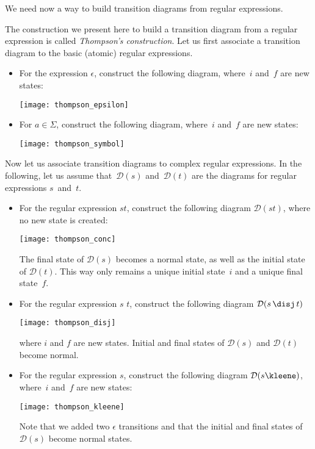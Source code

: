 We need now a way to build transition diagrams from regular
expressions.

The construction we present here to build a transition diagram from a
regular expression is called \emph{Thompson's construction}. Let us
first associate a transition diagram to the basic (atomic) regular
expressions.
\begin{itemize}

  \item For the expression \(\epsilon\), construct the following
    diagram, where~\(i\) and~\(f\) are new states:
  \begin{center}
    \texttt{[image: thompson\_epsilon]}
  \end{center}

  \item For \(a \in \Sigma\), construct the following diagram,
    where~\(i\) and~\(f\) are new states:
  \begin{center}
    \texttt{[image: thompson\_symbol]}
  \end{center}

\end{itemize}
Now let us associate transition diagrams to complex regular
expressions. In the following, let us assume that~\(\mathcal{D}(s)\)
and~\(\mathcal{D}(t)\) are the diagrams for regular expressions
\(s\)~and~\(t\).
\begin{itemize}

  \item For the regular expression \(st\), construct the following
    diagram \(\mathcal{D}(st)\), where no new state is created:
\begin{center}
\texttt{[image: thompson\_conc]}
\end{center}
  The final state of \(\mathcal{D}(s)\) becomes a normal state, as
  well as the initial state of \(\mathcal{D}(t)\). This way only
  remains a unique initial state~\(i\) and a unique final state~\(f\).

  \item For the regular expression \(s\) \disj \(t\), construct the
    following diagram \(\mathcal{D}(s \, \text{\disj} \, t)\)
\begin{center}
\texttt{[image: thompson\_disj]}
\end{center}
where \(i\) and \(f\) are new states. Initial and final states of
\(\mathcal{D}(s)\) and \(\mathcal{D}(t)\) become normal.

  \item For the regular expression \(s\)\kleene, construct the
    following diagram \(\mathcal{D}(s\text{\kleene})\), where~\(i\)
    and~\(f\) are new states:
\begin{center}
\texttt{[image: thompson\_kleene]}
\end{center}
Note that we added two \(\epsilon\) transitions and that the initial
and final states of \(\mathcal{D}(s)\) become normal states.

\end{itemize}
